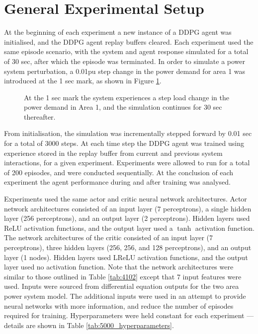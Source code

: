 \section{General Experimental Setup}
At the beginning of each experiment a new instance of a DDPG agent was initialised, and the DDPG agent replay buffers cleared. Each experiment used the same episode scenario, with the system and agent response simulated for a total of 30 sec, after which the episode was terminated. In order to simulate a power system perturbation, a 0.01pu step change in the power demand for area 1 was introduced at the 1 sec mark, as shown in Figure \ref{fig:5001_demand_profile}.

\begin{figure}[h]
	\centering
	
	\caption[Preliminary investigation load demand step change]{At the 1 sec mark the system experiences a step load change in the power demand in Area 1, and the simulation continues for 30 sec thereafter.}
	\label{fig:5001_demand_profile}
\end{figure}

From initialisation, the simulation was incrementally stepped forward by 0.01 sec for a total of 3000 steps. At each time step the DDPG agent was trained using experience stored in the replay buffer from current and previous system interactions, for a given experiment. Experiments were allowed to run for a total of 200 episodes, and were conducted sequentially. At the conclusion of each experiment the agent performance during and after training was analysed.

Experiments used the same actor and critic neural network architectures. Actor network architectures consisted of an input layer (7 perceptrons), a single hidden layer (256 perceptrons), and an output layer (2 perceptrons). Hidden layers used ReLU activation functions, and the output layer used a $\tanh$ activation function. The network architectures of the critic consisted of an input layer (7 perceptrons), three hidden layers (256, 256, and 128 perceptrons), and an output layer (1 nodes). Hidden layers used LReLU activation functions, and the output layer used no activation function. Note that the network architectures were similar to those outlined in Table \ref{tab:4102} except that 7 input features were used. Inputs were sourced from differential equation outputs for the two area power system model. The additional inputs were used in an attempt to provide neural networks with more information, and reduce the number of episodes required for training. Hyperparameters were held constant for each experiment --- details are shown in Table \ref{tab:5000_hyperparameters}.


